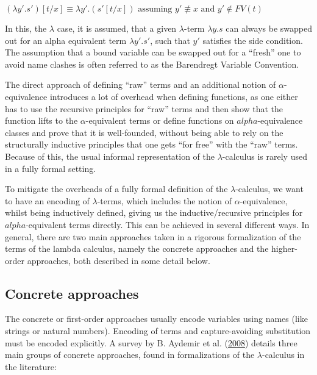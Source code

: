 \documentclass[a4paper, 12pt, twoside]{style/ociamthesis}
\theoremstyle{plain}
\theoremstyle{definition}
\theoremstyle{remark}
\begin{document}
\begin{center}
$(\lambda y'. s')[t/x] \equiv \lambda y'.(s'[t/x]) \text{ assuming } y' \not\equiv x\text{ and }y' \not\in FV(t)$
\end{center}

In this, the \(\lambda\) case, it is assumed, that a given
\(\lambda\)-term \(\lambda y. s\) can always be swapped out for an alpha
equivalent term \(\lambda y'. s'\), such that \(y'\) satisfies the side
condition. The assumption that a bound variable can be swapped out for a
``fresh'' one to avoid name clashes is often referred to as the
Barendregt Variable Convention.

The direct approach of defining ``raw'' terms and an additional notion
of \(\alpha\)-equivalence introduces a lot of overhead when defining
functions, as one either has to use the recursive principles for ``raw''
terms and then show that the function lifts to the \(\alpha\)-equivalent
terms or define functions on \(alpha\)-equivalence classes and prove
that it is well-founded, without being able to rely on the structurally
inductive principles that one gets ``for free'' with the ``raw''
terms.\\
Because of this, the usual informal representation of the
\(\lambda\)-calculus is rarely used in a fully formal setting.

To mitigate the overheads of a fully formal definition of the
\(\lambda\)-calculus, we want to have an encoding of \(\lambda\)-terms,
which includes the notion of \(\alpha\)-equivalence, whilst being
inductively defined, giving us the inductive/recursive principles for
\(alpha\)-equivalent terms directly. This can be achieved in several
different ways. In general, there are two main approaches taken in a
rigorous formalization of the terms of the lambda calculus, namely the
concrete approaches and the higher-order approaches, both described in
some detail below.

\subsection{Concrete approaches}\label{concrete-approaches}

The concrete or first-order approaches usually encode variables using
names (like strings or natural numbers). Encoding of terms and
capture-avoiding substitution must be encoded explicitly. A survey by B.
Aydemir et al. (\protect\hyperlink{ref-aydemir08}{2008}) details three
main groups of concrete approaches, found in formalizations of the
\(\lambda\)-calculus in the literature:
\end{document}
